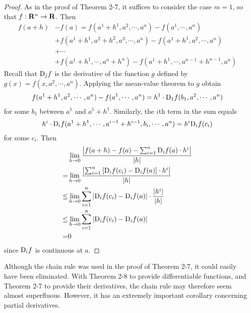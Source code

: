 \begin{proof}
    As in the proof of Theorem 2-7, it suffices to consider the case $m = 1$, so that 
    $f:\mathbf{R}^n\to \mathbf{R}$. Then 
    \begin{align*}
        f(a+h) &  - f(a) = f(a^1+h^1, a^2, \cdots, a^n) - f(a^1, \cdots, a^n) \\
        & + f(a^1+h^1, a^2+h^2, a^3, \cdots, a^n) - f(a^1+h^1, a^2, \cdots, a^n) \\
        & + \cdots \\
        & + f(a^1+h^1, \cdots, a^n+h^n) - f(a^1+h^1, \cdots, a^{n-1}+h^{n-1}, a^n)
    \end{align*}
    Recall that $\mathrm{D}_jf$ is the derivative of the function $g$ defined by $g(x) = f(x, a^2, \cdots, a^n)$. Applying 
    the mean-value theorem to $g$ obtain 
    \begin{align*}
        f(a^1+h^1, a^2, \cdots, a^n) - f(a^1, \cdots, a^n)
        = h^1\cdot \mathrm{D}_1f(b_1, a^2, \cdots, a^n)
    \end{align*}
    for some $b_1$ between $a^1$ and $a^1+h^1$. Similarly, the $i$th term in the sum equals
    \begin{align*}
        h^i\cdot \mathrm{D}_if(a^1+h^1, \cdots, a^{i-1}+h^{i-1}, b_i, \cdots, a^n)
        = h^i\mathrm{D}_if(c_i)
    \end{align*}
    for some $c_i$. Then 
    \begin{align*}
        &\lim_{h\to 0}{\frac{\left|f(a+h) - f(a) - \sum_{i=1}^{n }{\mathrm{D}_if(a)\cdot h^i}\right|}{|h|}} \\
        = & \lim_{h\to 0}{\frac{\left|\sum_{i=1}^{n }{\left[\mathrm{D}_if(c_i) - \mathrm{D}_if(a)\right]\cdot h^i}\right|}{|h|}} \\
        \le & \lim_{h\to 0}{\sum_{i=1}^{n }{\left|\mathrm{D}_if(c_i) - \mathrm{D}_if(a)\right|\cdot \frac{|h^i|}{|h|}}} \\
        \le & \lim_{h\to 0}{\sum_{i=1}^{n }{\left|\mathrm{D}_if(c_i) - \mathrm{D}_if(a)\right|}} \\
        = & 0
    \end{align*}
    since $\mathrm{D}_if$ is continuous at $a$.
\end{proof}

Although the chain rule was used in the proof of Theorem
2-7, it could easily have been eliminated. With Theorem 2-8 to
provide differentiable functions, and Theorem 2-7 to provide
their derivatives, the chain rule may therefore seem almost
superfluous. However, it has an extremely important corollary 
concerning partial derivatives.

